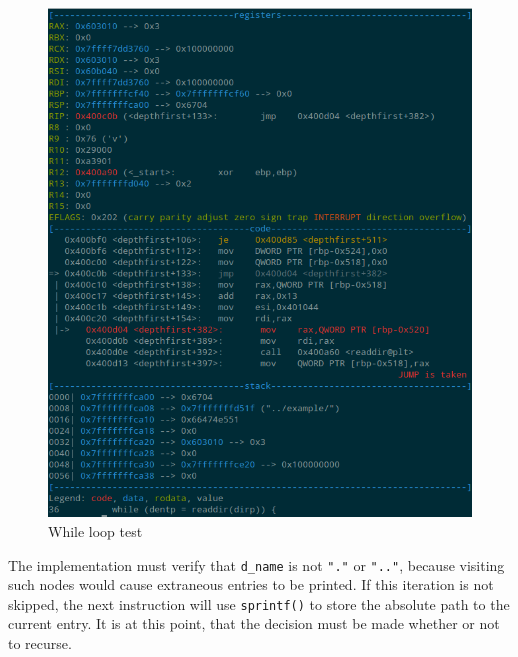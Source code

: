 \documentclass[a4paper,12pt,sffamily]{article}
\begin{document}
\begin{figure}[H]
	\centering
	\includegraphics[width=1\linewidth]{./images/6}
	\caption[while_loop_test]{While loop test}
	\label{fig:6}
\end{figure}
The implementation must verify that \texttt{d_name} is not \texttt{"."} or 
\texttt{".."}, because visiting such nodes would cause extraneous entries to be printed. If this
iteration is not skipped, the next instruction will use \texttt{sprintf()} to store the absolute
path to the current entry. It is at this point, that the decision must be made whether or not to recurse.
\end{document}
